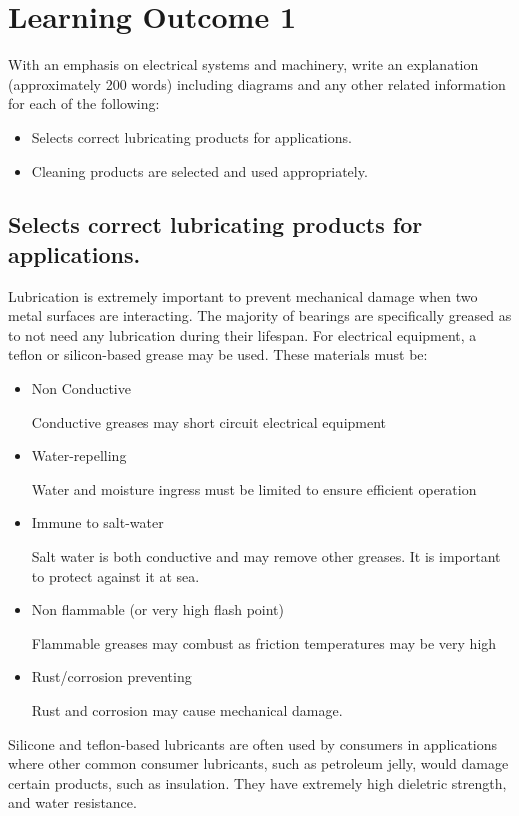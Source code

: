 \documentclass[11pt,a4paper]{article}
\begin{document}
\tableofcontents
\newpage
\section{Learning Outcome 1}
\begin{tcolorbox}[colback=red!5!white,colframe=red!75!black,title=\textbf{Demonstrate ability to use lubrication and cleaning materials and equipment}]
With an emphasis on electrical systems and machinery, write an explanation (approximately 200 words) including diagrams and any other related information for each of the following:
\begin{itemize}
\item Selects correct lubricating products for applications.
\item Cleaning products are selected and used appropriately.
\end{itemize}
\end{tcolorbox}
\subsection{Selects correct lubricating products for applications.}
Lubrication is extremely important to prevent mechanical damage when two metal surfaces are interacting. The majority of bearings are specifically greased as to not need any lubrication during their lifespan. For electrical equipment, a teflon or silicon-based grease may be used. These materials must be:
\begin{itemize}
\item Non Conductive

Conductive greases may short circuit electrical equipment
\item Water-repelling

Water and moisture ingress must be limited to ensure efficient operation
\item Immune to salt-water

Salt water is both conductive and may remove other greases. It is important to protect against it at sea.
\item Non flammable (or very high flash point)

Flammable greases may combust as friction temperatures may be very high
\item Rust/corrosion preventing

Rust and corrosion may cause mechanical damage.
\end{itemize}
Silicone and teflon-based lubricants are often used by consumers in applications where other common consumer lubricants, such as petroleum jelly, would damage certain products, such as insulation. They have extremely high dieletric strength, and water resistance.
\end{document}
